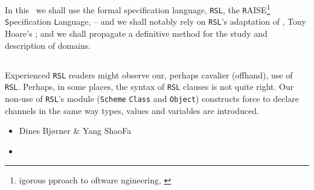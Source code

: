 \noindent
\pind In this \primer\ we shall use
\begynd 
\pind the formal specification language, \texttt{RSL}, 
\pind the \texttt{R}AISE\footnote{igorous
      pproach\ysfchgii{ }
      to  oftware ngineering,
      \cite{RaiseMethod}} \texttt{S}pecification 
      \texttt{L}anguage, \cite{RSL} -- 
\pind and we shall
      notably rely on \texttt{RSL}'s adaptation of , Tony
      Hoare's  \citecsp;
\pind and we shall propagate a definitive method for the study and
      description of domains.
\afslut
\afslut

\subsection*{} 


\subsection*{}

Experienced \texttt{RSL} \cite{RSL} readers might observe our,
perhaps cavalier (offhand), use of  \texttt{RSL}. Perhaps, in some places, the 
syntax of  \texttt{RSL} clauses is not quite right. Our non-use of
\texttt{RSL}'s module (\texttt{Scheme}\ysfchg{, } \texttt{Class} and \texttt{Object})
constructs force  to declare \textsf{channel}s in the same way
\textsf{type}s, \textsf{value}s and \textsf{variable}s are introduced.

\begin{itemize}

\item[] \hfill   Dines Bj{\o}rner \& Yang ShaoFa

\item[] \hfill \todaytime
\end{itemize}


\label{preface.n}
